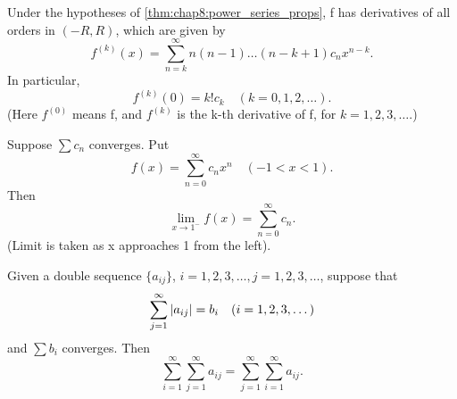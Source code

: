 \begin{corollary} %
  \label{cor:chap8:ps_coeffs}
  Under the hypotheses of \autoref{thm:chap8:power_series_props}, f
  has derivatives of all orders in $(-R, R)$, which are given by
  \begin{equation} \label{eq:chap8:ps_higher_deriv}
    f^{(k)}(x) = \sum_{n=k}^\infty n(n-1)\dots(n-k+1) c_n x^{n-k}.
  \end{equation}
  In particular,
  \begin{equation} \label{eq:chap8:ps_coeffs_formula}
    f^{(k)}(0) = k! c_k \quad (k=0, 1, 2, \dots).
  \end{equation}
  (Here $f^{(0)}$ means f, and $f^{(k)}$ is the k-th derivative of f,
  for $k=1, 2, 3, \dots$.)
\end{corollary}



\begin{theorem} %
  \label{thm:chap8:abels_theorem}
  Suppose $\sum c_n$ converges. Put
  \[ f(x) = \sum_{n=0}^\infty c_n x^n \quad (-1 < x < 1). \]
  Then
  \begin{equation} \label{eq:chap8:abel_limit}
    \lim_{x \to 1^-} f(x) = \sum_{n=0}^\infty c_n.
  \end{equation}
  (Limit is taken as x approaches 1 from the left).
\end{theorem}




\begin{theorem} %
  \label{thm:chap8:summation_interchange}
  Given a double sequence $\{a_{ij}\}$, $i=1, 2, 3, \dots, j=1, 2, 3,
  \dots$, suppose that
  \begin{equation} \label{eq:chap8:abs_row_sum}
    \sum_{j=1}^\infty \left\lvert a_{ij} \right\rvert = b_i \quad (i=1, 2, 3, \dots)
  \end{equation}
  and $\sum b_i$ converges. Then
  \begin{equation} \label{eq:chap8:sum_interchange_result}
    \sum_{i=1}^\infty \sum_{j=1}^\infty a_{ij} = \sum_{j=1}^\infty
    \sum_{i=1}^\infty a_{ij}.
  \end{equation}
\end{theorem}

